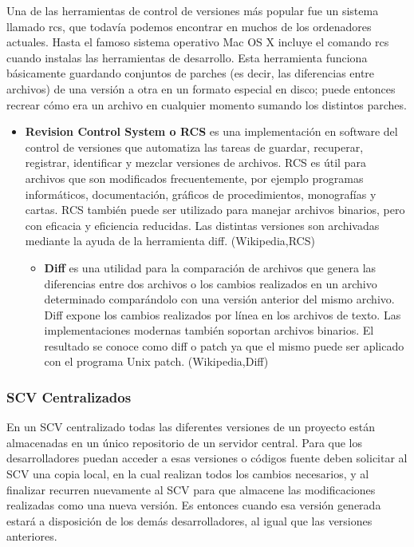 \documentclass[a4paper,12pt]{article}
\begin{document}
{Una de las herramientas de control de versiones más popular fue un sistema llamado rcs, que todavía podemos encontrar en muchos de los ordenadores actuales. Hasta el famoso sistema operativo Mac OS X incluye el comando rcs cuando instalas las herramientas de desarrollo. Esta herramienta funciona básicamente guardando conjuntos de parches (es decir, las diferencias entre archivos) de una versión a otra en un formato especial en disco; puede entonces recrear cómo era un archivo en cualquier momento sumando los distintos parches.

\begin{itemize}
	\item \textbf{Revision Control System o RCS } es una implementación en software del control de versiones que automatiza las tareas de guardar, recuperar, registrar, identificar y mezclar versiones de archivos. RCS es útil para archivos que son modificados frecuentemente, por ejemplo programas informáticos, documentación, gráficos de procedimientos, monografías y cartas. RCS también puede ser utilizado para manejar archivos binarios, pero con eficacia y eficiencia reducidas. Las distintas versiones son archivadas mediante la ayuda de la herramienta diff. (Wikipedia,RCS)
	\begin{itemize}
		\item \textbf{Diff } es una utilidad para la comparación de archivos que genera las diferencias entre dos archivos o los cambios realizados en un archivo determinado comparándolo con una versión anterior del mismo archivo. Diff expone los cambios realizados por línea en los archivos de texto. Las implementaciones modernas también soportan archivos binarios. El resultado se conoce como diff o patch ya que el mismo puede ser aplicado con el programa Unix patch. (Wikipedia,Diff)
		
	\end{itemize}
	
\end{itemize}



\subsubsection{SCV Centralizados}
En un SCV centralizado todas las diferentes versiones de un proyecto están almacenadas en un único repositorio de un servidor central. Para que los desarrolladores puedan acceder a esas versiones o códigos fuente deben solicitar al SCV una copia local, en la cual realizan todos los cambios necesarios, y al finalizar recurren nuevamente al SCV para que almacene las modificaciones realizadas como una nueva versión. Es entonces cuando esa versión generada estará a disposición de los demás desarrolladores, al igual que las versiones anteriores.



}
\end{document}
